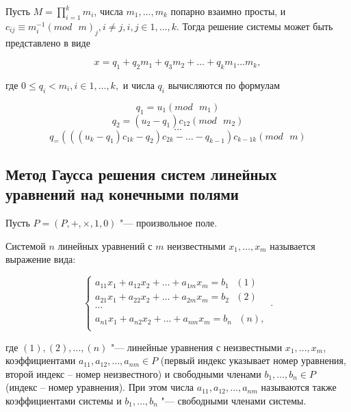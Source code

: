 \documentclass[bachelor, och, labwork]{shiza}
\begin{document}
        Пусть $M = \prod_{i = 1}^{k} m_i$, числа $m_1, \dots, m_k$ попарно
        взаимно просты, и $c_{ij} \equiv m_i^{-1} (mod \text{ } m)_j, i \neq j,
        i,j \in 1, \dots, k.$ Тогда решение системы может быть представлено в
        виде

        $$x = q_1 + q_2 m_1 + q_3 m_2 + \dots + q_k m_1 \dots m_k,$$

        где $0 \leq q_i < m_i, i \in 1, \dots, k,$ и числа $q_i$ вычисляются по
        формулам

        $$q_1 = u_1 (mod \text{ } m_1)$$
        $$q_2 = (u_2 - q_1)c_{12} (mod \text{ } m_2)$$
        $$\dots$$
        $$q_ = (((u_k - q_1)c_{1k} - q_2)c_{2k} - \dots - q_{k-1})c_{k-1k} (mod \text{ } m)$$

    \subsection{Метод Гаусса решения систем линейных уравнений над конечными
    полями}

        Пусть $P = (P, +, \times, 1, 0)$ "--- произвольное поле.

        Системой $n$ линейных уравнений с $m$ неизвестными $x_1, \dots, x_m$
        называется выражение вида:
        
        \begin{equation}
            \begin{cases}
                a_{11} x_1 + a_{12} x_2 + \dots + a_{1m}x_m = b_1 \text{ } (1)\\            
                a_{21} x_1 + a_{22} x_2 + \dots + a_{2m}x_m = b_2 \text{ } (2)\\            
                \cdots\\
                a_{n1} x_1 + a_{n2} x_2 + \dots + a_{nm}x_m = b_n \text{ } (n),\\            
            \end{cases}\,.
        \end{equation}
        
        где $(1), (2), \dots, (n)$ "--- линейные уравнения с неизвестными $x_1,
        \dots, x_m$, коэффициентами $a_{11}, a_{12}, \dots, a_{nm} \in P$
        (первый индекс указывает номер уравнения, второй индекс – номер
        неизвестного) и свободными членами $b_1, \dots, b_n \in P$ (индекс –
        номер уравнения). При этом числа $a_{11}, a_{12}, \dots, a_{nm}$
        называются также коэффициентами системы и $b_1, \dots, b_n$ "---
        свободными членами системы.
\end{document}
